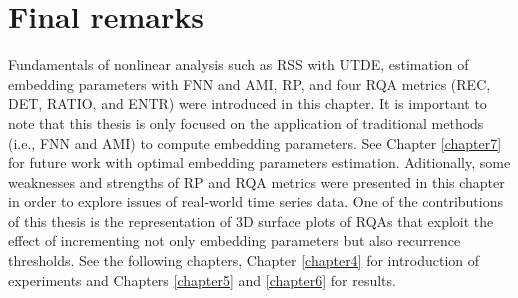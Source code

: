 %


\newpage
\section{Final remarks}
Fundamentals of nonlinear analysis such 
as RSS with UTDE, estimation of embedding parameters with FNN and AMI, RP, 
and four RQA metrics (REC, DET, RATIO, and ENTR) were introduced in this chapter.
It is important to note that this thesis is only focused on
the application of traditional methods (i.e., FNN and AMI) 
to compute embedding parameters.
See Chapter \ref{chapter7} for future work with 
optimal embedding parameters estimation.
Aditionally, some weaknesses and strengths of RP and RQA metrics 
were presented in this chapter in order to explore
issues of real-world time series data.
One of the contributions of this thesis
is the representation of 3D surface plots of RQAs
that exploit the effect of incrementing 
not only embedding parameters \citep{iwanski1998} but also 
recurrence thresholds.
See the following chapters, 
Chapter \ref{chapter4} for introduction of experiments and
Chapters \ref{chapter5} and \ref{chapter6} for results.


